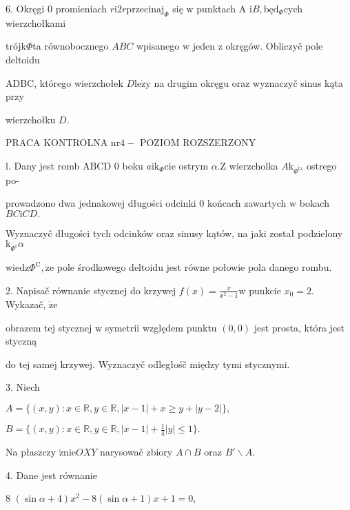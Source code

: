 \documentclass[a4paper,12pt]{article}
\begin{document}
6. Okręgi $0$ promieniach $r\mathrm{i}2r\mathrm{p}\mathrm{r}\mathrm{z}\mathrm{e}\mathrm{c}\mathrm{i}\mathrm{n}\mathrm{a}\mathrm{j}_{\Phi}$ się $\mathrm{w}$ punktach A $\mathrm{i}B, \mathrm{b}\text{ę} \mathrm{d}_{\Phi}$cych wierzchołkami

trójk$\Phi$ta równobocznego $ABC$ wpisanego $\mathrm{w}$ jeden $\mathrm{z}$ okręgów. Obliczyč pole deltoidu

ADBC, którego wierzchołek $D\mathrm{l}\mathrm{e}\dot{\mathrm{z}}\mathrm{y}$ na drugim okręgu oraz wyznaczyč sinus kąta przy

wierzchołku $D.$





PRACA KONTROLNA $\mathrm{n}\mathrm{r} 4-$ POZIOM ROZSZERZONY

l. Dany jest romb ABCD $0$ boku $a\mathrm{i}\mathrm{k}_{\Phi}\mathrm{c}\mathrm{i}\mathrm{e}$ ostrym $\alpha. \mathrm{Z}$ wierzcholka $A\mathrm{k}_{\Phi^{\mathrm{t}\mathrm{a}}}$ ostrego po-

prowadzono dwa jednakowej długości odcinki $0$ końcach zawartych $\mathrm{w}$ bokach $BC\mathrm{i}CD.$

Wyznaczyč długości tych odcinków oraz sinusy kątów, na jaki został podzielony $\mathrm{k}_{\Phi^{\mathrm{t}}}\alpha$

$\mathrm{w}\mathrm{i}\mathrm{e}\mathrm{d}\mathrm{z}\Phi^{\mathrm{C}}, \dot{\mathrm{z}}\mathrm{e}$ pole środkowego deltoidu jest równe połowie pola danego rombu.

2. Napisač równanie stycznej do krzywej $f(x)=\displaystyle \frac{x}{x^{2}-1} \mathrm{w}$ punkcie $x_{0} = 2$. Wykazač, $\dot{\mathrm{z}}\mathrm{e}$

obrazem tej stycznej $\mathrm{w}$ symetrii względem punktu $(0,0)$ jest prosta, która jest styczną

do tej samej krzywej. Wyznaczyč odległośč między tymi stycznymi.

3. Niech

$A=\{(x,y):x\in \mathbb{R},y\in \mathbb{R},|x-1|+x\geq y+|y-2|\},$

$B=\displaystyle \{(x,y):x\in \mathbb{R},y\in \mathbb{R},|x-1|+\frac{1}{4}|y|\leq 1\}.$

Na płaszczy $\acute{\mathrm{z}}\mathrm{n}\mathrm{i}\mathrm{e}OXY$ narysowač zbiory $A\cap B$ oraz $B'\backslash A.$

4. Dane jest równanie

8 $(\sin\alpha+4)x^{2}-8(\sin\alpha+1)x+1=0,$
\end{document}

